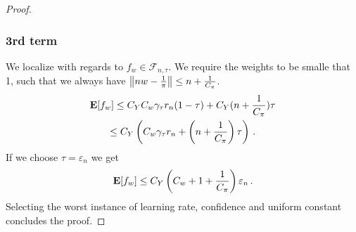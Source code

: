 \begin{proof}
\subsubsection*{3rd term}
We localize with regards to 
$
f_w \in \mathcal{F}_{n,\tau}
.
$
We require the weights to be smalle that 1, such that 
we always have
$
\left\lVert nw-  \frac{1}{\pi}\right\rVert
\le
n + \frac{1}{C_\pi}
$.
\begin{gather}
  \mathbf{E}[f_w]
  \le
  C_Y 
  C_w
  \gamma_\tau
  r_n
  (1-\tau)
  +
  C_Y
  (
n + \frac{1}{C_\pi}
  )
  \tau
  \\
  \le
  C_Y
  \left( 
  C_w
  \gamma_\tau
  r_n
  +
  \left(
n + \frac{1}{C_\pi}
  \right)
  \tau
  \right)
  \,.
\end{gather}
If we choose  $\tau=\varepsilon_n$
we get
\begin{gather}
  \mathbf{E}[f_w]
  \le
  C_Y
  \left( 
C_w+1+ \frac{1}{C_\pi}
  \right)
  \varepsilon_n
  \,.
\end{gather}
Selecting the worst instance of learning rate, confidence and uniform constant concludes the proof.

\end{proof}
